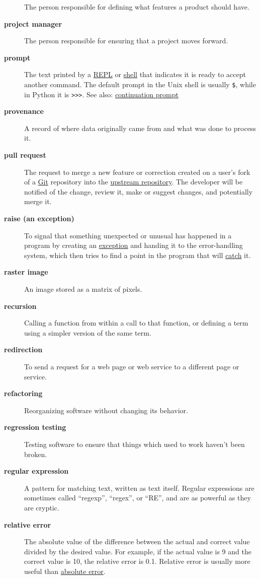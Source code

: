 \documentclass[
]{krantz}
\begin{document}
\begin{description}
The person responsible for defining what features a product should have.
\item[\textbf{project manager}]
The person responsible for ensuring that a project moves forward.
\item[\textbf{prompt}]
The text printed by a \protect\hyperlink{repl}{REPL} or \protect\hyperlink{shell}{shell} that indicates it is ready to accept another command. The default prompt in the Unix shell is usually \texttt{\$}, while in Python it is \texttt{\textgreater{}\textgreater{}\textgreater{}}. See also: \protect\hyperlink{continuation_prompt}{continuation prompt}
\item[\textbf{provenance}]
A record of where data originally came from and what was done to process it.
\item[\textbf{pull request}]
The request to merge a new feature or correction created on a user's fork of a \protect\hyperlink{git}{Git} repository into the \protect\hyperlink{upstream_repository}{upstream repository}. The developer will be notified of the change, review it, make or suggest changes, and potentially merge it.
\item[\textbf{raise (an exception)}]
To signal that something unexpected or unusual has happened in a program by creating an \protect\hyperlink{exception}{exception} and handing it to the error-handling system, which then tries to find a point in the program that will \protect\hyperlink{catch_exception}{catch} it.
\item[\textbf{raster image}]
An image stored as a matrix of pixels.
\item[\textbf{recursion}]
Calling a function from within a call to that function, or defining a term using a simpler version of the same term.
\item[\textbf{redirection}]
To send a request for a web page or web service to a different page or service.
\item[\textbf{refactoring}]
Reorganizing software without changing its behavior.
\item[\textbf{regression testing}]
Testing software to ensure that things which used to work haven't been broken.
\item[\textbf{regular expression}]
A pattern for matching text, written as text itself. Regular expressions are sometimes called ``regexp'', ``regex'', or ``RE'', and are as powerful as they are cryptic.
\item[\textbf{relative error}]
The absolute value of the difference between the actual and correct value divided by the desired value. For example, if the actual value is 9 and the correct value is 10, the relative error is 0.1. Relative error is usually more useful than \protect\hyperlink{absolute_error}{absolute error}.

\end{description}
\end{document}
